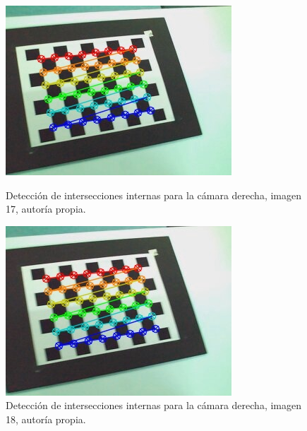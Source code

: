 \documentclass[a4paper,12pt]{article}
\begin{document}
{\begin{figure}[h]
    \centering
    \begin{minipage}[b]{0.45\textwidth}
        \centering
        \includegraphics[width=\textwidth]{fonts/detected_17.jpg}
        \caption{Detección de intersecciones internas para la cámara derecha, imagen 17, autoría propia.}
        \label{fig:izquierda1}
    \end{minipage}
    \hfill
    \begin{minipage}[b]{0.45\textwidth}
        \centering
        \includegraphics[width=\textwidth]{fonts/detected_18.jpg}
        \caption{Detección de intersecciones internas para la cámara derecha, imagen 18, autoría propia.}
        \label{fig:derecha1}
    \end{minipage}


\end{figure}}
\end{document}
